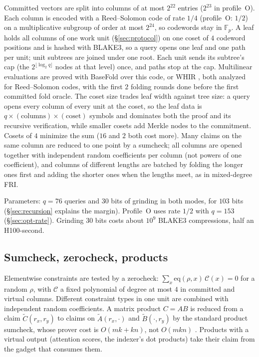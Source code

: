 \documentclass[11pt]{article}
\newcommand{\F}{\mathbb{F}}
\newcommand{\Fp}{\F_p}
\begin{document}
Committed vectors are split into columns of at most \(2^{22}\) entries (\(2^{23}\) in profile~O).
Each column is encoded with a Reed--Solomon code of rate \(1/4\) (profile~O: \(1/2\)) on a multiplicative subgroup of order at most \(2^{24}\), so codewords stay in \(\Fp\).
A leaf holds all columns of one work unit (\S\ref{sec:protocol}) on one coset of \(4\) codeword positions and is hashed with BLAKE3, so a query opens one leaf and one path per unit; unit subtrees are joined under one root.
Each unit sends its subtree's cap (the \(2^{\lfloor \log_2 q \rfloor}\) nodes at that level) once, and paths stop at the cap.
Multilinear evaluations are proved with BaseFold \cite{basefold} over this code, or WHIR \cite{whir}, both analyzed for Reed--Solomon codes, with the first \(2\) folding rounds done before the first committed fold oracle.
The coset size trades leaf width against tree size: a query opens every column of every unit at the coset, so the leaf data is \(q \times (\text{columns}) \times (\text{coset})\) symbols and dominates both the proof and its recursive verification, while smaller cosets add Merkle nodes to the commitment. Cosets of \(4\) minimize the sum (\(16\) and \(2\) both cost more).
Many claims on the same column are reduced to one point by a sumcheck; all columns are opened together with independent random coefficients per column (not powers of one coefficient), and columns of different lengths are batched by folding the longer ones first and adding the shorter ones when the lengths meet, as in mixed-degree FRI.

Parameters: \(q = 76\) queries and \(30\) bits of grinding in both modes, for \(103\) bits (\S\ref{sec:recursion} explains the margin).
Profile~O uses rate \(1/2\) with \(q = 153\) (\S\ref{sec:opt-rate}).
Grinding \(30\) bits costs about \(10^9\) BLAKE3 compressions, half an H100-second.

\subsection{Sumcheck, zerocheck, products}

Elementwise constraints are tested by a zerocheck: \(\sum_x \mathrm{eq}(\rho, x)\, \mathcal{C}(x) = 0\) for a random \(\rho\), with \(\mathcal{C}\) a fixed polynomial of degree at most \(4\) in committed and virtual columns.
Different constraint types in one unit are combined with independent random coefficients.
A matrix product \(C = AB\) is reduced from a claim \(\tilde C(r_x, r_y)\) to claims on \(\tilde A(r_x, \cdot)\) and \(\tilde B(\cdot, r_y)\) by the standard product sumcheck, whose prover cost is \(O(mk + kn)\), not \(O(mkn)\) \cite{thaler}.
Products with a virtual output (attention scores, the indexer's dot products) take their claim from the gadget that consumes them.
\end{document}
